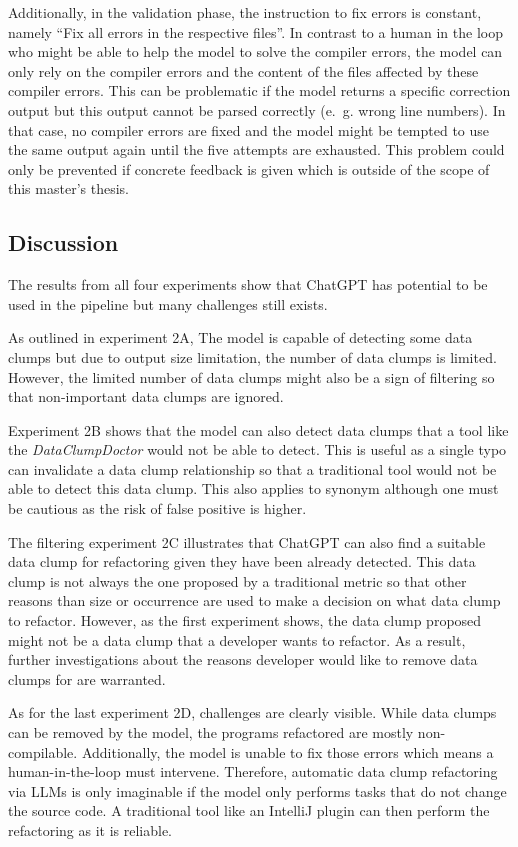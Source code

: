 Additionally, in the validation phase, the instruction to fix errors is constant, namely \enquote{Fix all errors in the respective files}. In contrast to a human in the loop who might be able to help the model to solve the compiler errors, the model can only rely on the compiler errors and the content of the files affected by these compiler errors. This can be problematic if the model returns a specific correction output but this output cannot be parsed correctly (e.~g. wrong line numbers). In that case, no compiler errors are fixed and the model might be tempted to use the same output again until the five attempts are exhausted. This problem could only be prevented if concrete feedback is given which is outside of the scope of this master's thesis. 

\subsection{Discussion}



The results from all four experiments show that ChatGPT has potential to be used in the pipeline but many challenges still exists.

As outlined in experiment 2A, The model is capable of detecting some data clumps but due to output size limitation, the number of data clumps is limited. However, the limited number of data clumps might also be a sign of filtering so that non-important data clumps are ignored.

Experiment 2B shows that the model can also detect data clumps that a tool like the \textit{DataClumpDoctor} would not be able to detect. This is useful as a single typo can invalidate a data clump relationship so that a traditional tool would not be able to detect this data clump. This also applies to synonym although one must be cautious as the risk of false positive is higher.

The filtering experiment 2C illustrates that ChatGPT can also find a suitable data clump for refactoring given they have been already detected. This data clump is not always the one proposed by a traditional metric so that other reasons than size or occurrence are used to make a decision on what data clump to refactor. However, as the first experiment shows, the data clump proposed might not be a data clump that a developer wants to refactor. As a result, further investigations about the reasons developer would like to remove data clumps for are warranted.

As for the last experiment 2D,  challenges are clearly visible. While data clumps can be removed by the model, the programs refactored are mostly non-compilable. Additionally, the model is unable to fix those errors which means a human-in-the-loop must intervene. Therefore, automatic data clump refactoring via \acp{LLM} is only imaginable if the model only performs tasks that do not change the source code. A traditional tool like an IntelliJ plugin can then perform the refactoring as it is reliable. 


